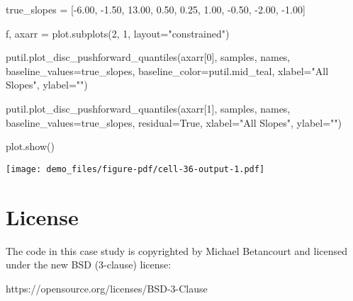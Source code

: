 \documentclass[
  letterpaper,
  DIV=11,
  numbers=noendperiod]{scrartcl}
\newenvironment{Shaded}{\begin{snugshade}}{\end{snugshade}}
\newcommand{\DecValTok}[1]{\textcolor[rgb]{0.68,0.00,0.00}{#1}}
\newcommand{\FloatTok}[1]{\textcolor[rgb]{0.68,0.00,0.00}{#1}}
\newcommand{\NormalTok}[1]{\textcolor[rgb]{0.00,0.23,0.31}{#1}}
\newcommand{\OperatorTok}[1]{\textcolor[rgb]{0.37,0.37,0.37}{#1}}
\newcommand{\StringTok}[1]{\textcolor[rgb]{0.13,0.47,0.30}{#1}}
\newcommand{\VariableTok}[1]{\textcolor[rgb]{0.07,0.07,0.07}{#1}}
\begin{document}
\begin{Shaded}
\begin{Highlighting}[]
\NormalTok{true\_slopes }\OperatorTok{=}\NormalTok{ [}\OperatorTok{{-}}\FloatTok{6.00}\NormalTok{, }\OperatorTok{{-}}\FloatTok{1.50}\NormalTok{, }\FloatTok{13.00}\NormalTok{,  }\FloatTok{0.50}\NormalTok{, }\FloatTok{0.25}\NormalTok{,}
               \FloatTok{1.00}\NormalTok{, }\OperatorTok{{-}}\FloatTok{0.50}\NormalTok{, }\OperatorTok{{-}}\FloatTok{2.00}\NormalTok{, }\OperatorTok{{-}}\FloatTok{1.00}\NormalTok{]}

\NormalTok{f, axarr }\OperatorTok{=}\NormalTok{ plot.subplots(}\DecValTok{2}\NormalTok{, }\DecValTok{1}\NormalTok{, layout}\OperatorTok{=}\StringTok{"constrained"}\NormalTok{)}

\NormalTok{putil.plot\_disc\_pushforward\_quantiles(axarr[}\DecValTok{0}\NormalTok{], samples, names,}
\NormalTok{                                      baseline\_values}\OperatorTok{=}\NormalTok{true\_slopes,}
\NormalTok{                                      baseline\_color}\OperatorTok{=}\NormalTok{putil.mid\_teal,}
\NormalTok{                                      xlabel}\OperatorTok{=}\StringTok{"All Slopes"}\NormalTok{, ylabel}\OperatorTok{=}\StringTok{""}\NormalTok{)}

\NormalTok{putil.plot\_disc\_pushforward\_quantiles(axarr[}\DecValTok{1}\NormalTok{], samples, names,}
\NormalTok{                                      baseline\_values}\OperatorTok{=}\NormalTok{true\_slopes,}
\NormalTok{                                      residual}\OperatorTok{=}\VariableTok{True}\NormalTok{,}
\NormalTok{                                      xlabel}\OperatorTok{=}\StringTok{"All Slopes"}\NormalTok{, ylabel}\OperatorTok{=}\StringTok{""}\NormalTok{)}

\NormalTok{plot.show()}
\end{Highlighting}
\end{Shaded}

\texttt{[image: demo\_files/figure-pdf/cell-36-output-1.pdf]}

\section*{License}\label{license}

The code in this case study is copyrighted by Michael Betancourt and
licensed under the new BSD (3-clause) license:

https://opensource.org/licenses/BSD-3-Clause
\end{document}
